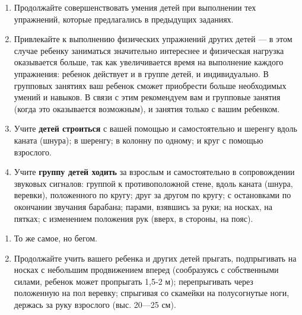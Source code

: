 \documentclass{book}
\begin{document}
\begin{enumerate}
\def\labelenumi{\arabic{enumi}.}
\item
  
  Продолжайте совершенствовать умения детей при выполнении тех
  упражнений, которые предлагались в предыдущих заданиях.
  
\item
  
  Привлекайте к выполнению физических упражнений других детей --- в этом
  случае ребенку заниматься значительно интереснее и физическая нагрузка
  оказывается больше, так как увеличивается время на выполнение каждого
  упражнения: ребенок действует и в группе детей, и индивидуально. В
  групповых занятиях ваш ребенок сможет приобрести больше необходимых
  умений и навыков. В связи с этим рекомендуем вам и групповые занятия
  (когда это оказывается возможным), и занятия только с вашим ребенком.
  
\item
  
  Учите \textbf{детей строиться} с вашей помощью и самостоятельно и
  шеренгу вдоль каната (шнура); в шеренгу; в колонну по одному; и круг с
  помощью взрослого.
  
\item
  
  Учите \textbf{группу детей ходить} за взрослым и самостоятельно в
  сопровождении звуковых сигналов: группой к противоположной стене,
  вдоль каната (шнура, веревки), положенного по кругу; друг за другом по
  кругу; с остановками по окончании звучания барабана; парами, взявшись
  за руки; на носках, на пятках; с изменением положения рук (вверх, в
  стороны, на пояс).
  
\end{enumerate}

\begin{enumerate}
\def\labelenumi{\arabic{enumi}.}
\setcounter{enumi}{4}
\item
  
  То же самое, но бегом.
  
\item
  
  Продолжайте учить вашего ребенка и других детей прыгать, подпрыгивать
  на носках с небольшим продвижением вперед (сообразуясь с собственными
  силами, ребенок может пропрыгать 1,5-2 м); перепрыгивать через
  положенную на пол веревку; спрыгивая со скамейки на полусогнутые ноги,
  держась за руку взрослого (выс. 20---25 см).
  
\end{enumerate}
\end{document}
